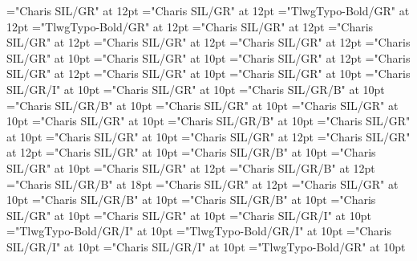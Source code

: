 \documentclass[a4paper,twoside]{article}
\begin{document}
\pagestyle{plain}
\sloppy
\setlength{\parfillskip}{0pt plus 1fil}
\font\diven="Charis SIL/GR" at 12pt
\font\spanen="Charis SIL/GR" at 12pt
\font\divpt="TlwgTypo-Bold/GR" at 12pt
\font\spanpt="TlwgTypo-Bold/GR" at 12pt
\font\divseh="Charis SIL/GR" at 12pt
\font\spanseh="Charis SIL/GR" at 12pt
\font\divsehfonipaxetic="Charis SIL/GR" at 12pt
\font\spansehfonipaxetic="Charis SIL/GR" at 12pt
\font\xitemen="Charis SIL/GR" at 10pt
\font\xitemxitemcomplexformrefsbefore="Charis SIL/GR" at 10pt
\font\xitemxitemdefinitionbefore="Charis SIL/GR" at 12pt
\font\xitemxitemdefinitionLcbefore="Charis SIL/GR" at 12pt
\font\xitemxitementryrefcomponentbefore="Charis SIL/GR" at 10pt
\font\xitemxitementryreftypebefore="Charis SIL/GR" at 10pt
\font\xitemxitemexamplebefore="Charis SIL/GR/I" at 10pt
\font\xitemxitemexamplesbefore="Charis SIL/GR" at 10pt
\font\xitemxitemheadwordbefore="Charis SIL/GR/B" at 10pt
\font\xitemxitemLexEntrypublishStemComponentTargetHeadWordRefbefore="Charis SIL/GR/B" at 10pt
\font\xitemxitemlexreftargetsbefore="Charis SIL/GR" at 10pt
\font\xitemxitemprimaryrefsbefore="Charis SIL/GR" at 10pt
\font\xitemxitemrelationsbefore="Charis SIL/GR" at 10pt
\font\xitemxitemsensecrossrefbefore="Charis SIL/GR/B" at 10pt
\font\sensesensesensesbefore="Charis SIL/GR" at 10pt
\font\sensesensesubsensesbefore="Charis SIL/GR" at 10pt
\font\xitemxitemtranslationbefore="Charis SIL/GR" at 12pt
\font\xitemxitemtranslationLcbefore="Charis SIL/GR" at 12pt
\font\xitemxitemvariantrefentrytypebefore="Charis SIL/GR" at 10pt
\font\xitemxitemvariantrefformbefore="Charis SIL/GR/B" at 10pt
\font\xitemxitemvariantrefsbefore="Charis SIL/GR" at 10pt
\font\xitemtpi="Charis SIL/GR" at 12pt
\font{}="Charis SIL/GR/B" at 12pt
\font{}="Charis SIL/GR/B" at 18pt
\font{}="Charis SIL/GR" at 12pt
\font\entryletDatadicBody="Charis SIL/GR" at 10pt
\font\headwordsehentryletDatadicBody="Charis SIL/GR/B" at 10pt
\font\spanenheadwordsehentryletDatadicBody="Charis SIL/GR/B" at 10pt
\font\sensesentryletDatadicBody="Charis SIL/GR" at 10pt
\font\sensesensesentryletDatadicBody="Charis SIL/GR" at 10pt
\font\grammaticalinfosensesensesentryletDatadicBody="Charis SIL/GR/I" at 10pt
\font\partofspeechptgrammaticalinfosensesensesentryletDatadicBody="TlwgTypo-Bold/GR/I" at 10pt
\font\spanptpartofspeechptgrammaticalinfosensesensesentryletDatadicBody="TlwgTypo-Bold/GR/I" at 10pt
\font\spanenpartofspeechptgrammaticalinfosensesensesentryletDatadicBody="Charis SIL/GR/I" at 10pt
\font\spanengrammaticalinfosensesensesentryletDatadicBody="Charis SIL/GR/I" at 10pt
\font{}="TlwgTypo-Bold/GR" at 10pt
\end{document}
